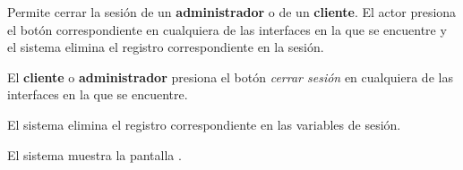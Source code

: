 %
%

{
  Permite cerrar la sesión de un \textbf{administrador} o de un \textbf{cliente}.
  El actor presiona el botón correspondiente en cualquiera de las interfaces en
  la que se encuentre y el sistema elimina el registro correspondiente
  en la sesión.

  \begin{trayectoriaPrincipal}

    \item El \textbf{cliente} o \textbf{administrador} presiona el botón
      \textit{cerrar sesión} en cualquiera de las interfaces en la que se
      encuentre.

    \item El sistema elimina el registro correspondiente en las variables
      de sesión.

    \item El sistema muestra la pantalla
      .

  \end{trayectoriaPrincipal}
}
